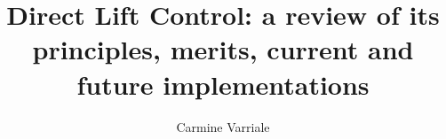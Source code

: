 \documentclass[12pt]{report}
\begin{document}
\begin{frontmatter}
    \title{Direct Lift Control: a review of its principles, merits, current
        and future implementations}
    \author[]{Carmine Varriale}
\end{frontmatter}


\glssetwidest[0]{}
\printglossary[type=symbols, title={List of symbols}, style=alttree-units]
\glsdisablehyper


\printglossary[type=acronym, title={List of acronyms}, style=alttree]







\printbibliography
\end{document}
